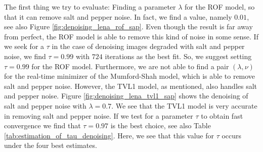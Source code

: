 \documentclass[abstracton]{scrreprt}
\begin{document}
            The first thing we try to evaluate: Finding a parameter $\lambda$ for the ROF model, so that it can remove salt and pepper noise. In fact, we find a value, namely $0.01$, see also Figure \ref{fig:denoising_lena_rof_sap}. Even though the result is far away from perfect, the ROF model is able to remove this kind of noise in some sense. If we seek for a $\tau$ in the case of denoising images degraded with salt and pepper noise, we find $\tau = 0.99$ with $724$ iterations as the best fit. So, we suggest setting $\tau = 0.99$ for the ROF model. Furthermore, we are not able to find a pair $(\lambda, \nu)$ for the real-time minimizer of the Mumford-Shah model, which is able to remove salt and pepper noise. However, the TVL1 model, as mentioned, also handles salt and pepper noise. Figure \ref{fig:denoising_lena_tvl1_sap} shows the denoising of salt and pepper noise with $\lambda = 0.7$. We see that the TVL1 model is very accurate in removing salt and pepper noise. If we test for a parameter $\tau$ to obtain fast convergence we find that $\tau = 0.97$ is the best choice, see also Table \ref{tab:estimation_of_tau_denoising}. Here, we see that this value for $\tau$ occurs under the four best estimates.\\
\end{document}
